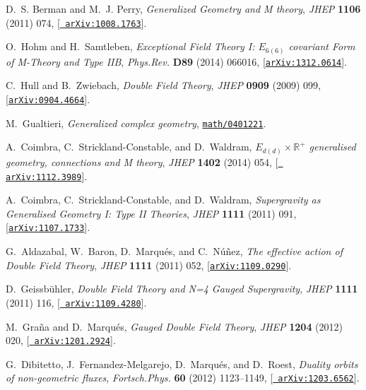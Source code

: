\documentclass{PoS}
\begin{document}
\begin{thebibliography}{99}
D.~S. Berman and M.~J. Perry, {\it {Generalized Geometry and M theory}},  {\em
  JHEP} {\bf 1106} (2011) 074, [\href{http://arxiv.org/abs/1008.1763}{{\tt
  arXiv:1008.1763}}].

O.~Hohm and H.~Samtleben, {\it {Exceptional Field Theory I: $E_{6(6)}$
  covariant Form of M-Theory and Type IIB}},  {\em Phys.Rev.} {\bf D89} (2014)
  066016, [\href{http://arxiv.org/abs/1312.0614}{{\tt arXiv:1312.0614}}].

C.~Hull and B.~Zwiebach, {\it {Double Field Theory}},  {\em JHEP} {\bf 0909}
  (2009) 099, [\href{http://arxiv.org/abs/0904.4664}{{\tt arXiv:0904.4664}}].

M.~Gualtieri, {\it {Generalized complex geometry}},
  \href{http://arxiv.org/abs/math/0401221}{{\tt math/0401221}}.

A.~Coimbra, C.~Strickland-Constable, and D.~Waldram, {\it {$E_{d(d)} \times
  \mathbb{R}^+$ generalised geometry, connections and M theory}},  {\em JHEP}
  {\bf 1402} (2014) 054, [\href{http://arxiv.org/abs/1112.3989}{{\tt
  arXiv:1112.3989}}].

A.~Coimbra, C.~Strickland-Constable, and D.~Waldram, {\it {Supergravity as
  Generalised Geometry I: Type II Theories}},  {\em JHEP} {\bf 1111} (2011)
  091, [\href{http://arxiv.org/abs/1107.1733}{{\tt arXiv:1107.1733}}].

G.~Aldazabal, W.~Baron, D.~Marqu{\'e}s, and C.~N{\'u}{\~n}ez, {\it {The
  effective action of Double Field Theory}},  {\em JHEP} {\bf 1111} (2011) 052,
  [\href{http://arxiv.org/abs/1109.0290}{{\tt arXiv:1109.0290}}].

D.~Geissb{\"u}hler, {\it {Double Field Theory and N=4 Gauged Supergravity}},
  {\em JHEP} {\bf 1111} (2011) 116, [\href{http://arxiv.org/abs/1109.4280}{{\tt
  arXiv:1109.4280}}].

M.~Gra{\~n}a and D.~Marqu{\'e}s, {\it {Gauged Double Field Theory}},  {\em
  JHEP} {\bf 1204} (2012) 020, [\href{http://arxiv.org/abs/1201.2924}{{\tt
  arXiv:1201.2924}}].

G.~Dibitetto, J.~Fernandez-Melgarejo, D.~Marqu{\'e}s, and D.~Roest, {\it
  {Duality orbits of non-geometric fluxes}},  {\em Fortsch.Phys.} {\bf 60}
  (2012) 1123--1149, [\href{http://arxiv.org/abs/1203.6562}{{\tt
  arXiv:1203.6562}}].


\end{thebibliography}
\end{document}
